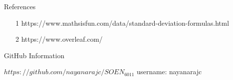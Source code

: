\documentclass[final]{beamer}
\newlength{\onecolwid}
\begin{document}
\begin{frame}
\begin{columns}[t]
\begin{column}{\onecolwid}

\begin{exampleblock}{References}
\begin{itemize}
\item [1] https://www.mathsisfun.com/data/standard-deviation-formulas.html\\
\item [2] https://www.overleaf.com/ \\
\end{itemize}
\end{exampleblock}








\begin{block}{GitHub Information}

$https://github.com/nayanarajc/SOEN_6011$ \newline
username: nayanarajc
\end{block}


\end{column}
\end{columns}
\end{frame}
\end{document}
